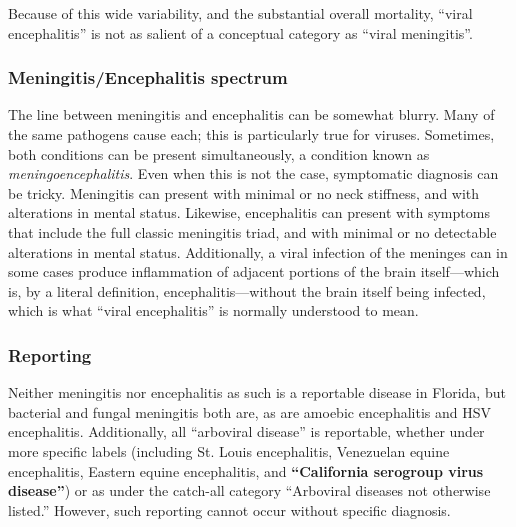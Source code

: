 \documentclass[12pt]{article}
\newcommand{\eg}{\textit{e.g.}}
\newcommand{\cjh}{\textcolor{blue}{cjh}}
\newcommand{\tjh}{\textcolor{red}{tjh}}
\newcommand{\msg}[3]{(#1 $\rightarrow$ #2: #3)}
\newcommand{\mct}[1]{\msg\cjh\tjh{#1}}
\begin{document}
            Because of this wide variability, and the substantial overall mortality, ``viral encephalitis'' is not as salient of a conceptual category as ``viral meningitis''.

        \subsubsection{Meningitis/Encephalitis spectrum}
            \label{spectrum}
            The line between meningitis and encephalitis can be somewhat blurry. Many of the same pathogens cause each; this is particularly true for viruses. Sometimes, both conditions can be present simultaneously, a condition known as \textit{meningoencephalitis}. Even when this is not the case, symptomatic diagnosis can be tricky. Meningitis can present with minimal or no neck stiffness, and with alterations in mental status. Likewise, encephalitis can present with symptoms that include the full classic meningitis triad, and with minimal or no detectable alterations in mental status. Additionally, a viral infection of the meninges can in some cases produce inflammation of adjacent portions of the brain itself---which is, by a literal definition, encephalitis---without the brain itself being infected, which is what ``viral encephalitis'' is normally understood to mean\cite{ropper2014adams}.
        
        \subsubsection{Reporting}
            \label{reporting}
            Neither meningitis nor encephalitis as such is a reportable disease in Florida, but bacterial and fungal meningitis both are, as are amoebic encephalitis and HSV encephalitis. Additionally, all ``arboviral disease'' is reportable, whether under more specific labels (including St. Louis encephalitis, Venezuelan equine encephalitis, Eastern equine encephalitis, and \textbf{``California serogroup virus disease''}) or as under the catch-all category ``Arboviral diseases not otherwise listed.''\cite{florida2016reportable} However, such reporting cannot occur without specific diagnosis.

\end{document}
